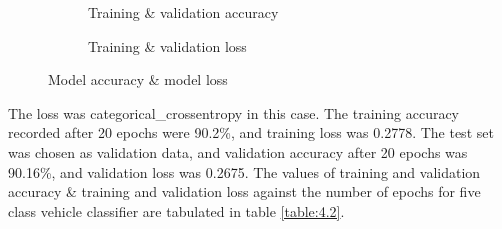 \begin{figure}[htbp]
    \centering
    \begin{subfigure}[t]{0.45\textwidth}
        \caption{Training \& validation accuracy}
        \label{fig:4.4a}
    \end{subfigure}
    \begin{subfigure}[t]{0.45\textwidth}
        \caption{Training \& validation loss}
        \label{fig:4.4b}
    \end{subfigure}
    \caption[]{Model accuracy \& model loss}
    \label{fig:4.6}
  \end{figure}
  The loss was categorical\_crossentropy in this case. 
  The training accuracy recorded after 20 epochs were 90.2\%, and training loss was 0.2778. The test set was chosen as validation data, and validation accuracy after 20 epochs was 90.16\%, and validation loss was 0.2675.
  The values of training
  and validation accuracy \& training and validation loss
  against the number of epochs for five class vehicle classifier
  are tabulated in table \ref{table:4.2}.

